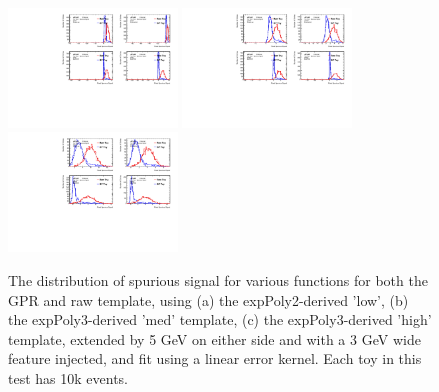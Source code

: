 \begin{figure} 
\begin{center}
  \includegraphics[width=0.4\textwidth]{figures/background/gpr/validation/linear/ToyTest_FitSigVals_lowpT_10k_Sig_1s}   
  \includegraphics[width=0.4\textwidth]{figures/background/gpr/validation/linear/ToyTest_FitSigVals_medpT_10k_Sig_1s}   
  \includegraphics[width=0.4\textwidth]{figures/background/gpr/validation/linear/ToyTest_FitSigVals_highpT_10k_Sig_1s}   
\caption{The distribution of spurious signal for various functions for both the GPR and raw template, using (a) the expPoly2-derived 'low', (b) the expPoly3-derived 'med' template, (c) the expPoly3-derived 'high' template, extended by 5 GeV on either side and with a 3 GeV wide feature injected, and fit using a linear error kernel. Each toy in this test has 10k events.}
\label{fig:linearkernel_lowpt_10k_Sig_1s}
\end{center}
\end{figure}

